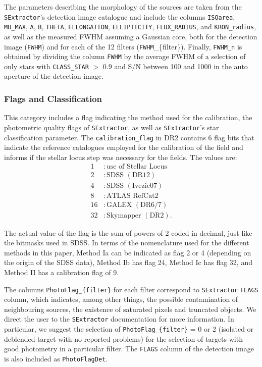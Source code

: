 \documentclass[fleqn,usenatbib]{mnras}
\begin{document}
The parameters describing the morphology of the sources are taken from the \texttt{SExtractor}'s detection image catalogue and include the columns \texttt{ISOarea}, \texttt{MU\_MAX}, \texttt{A}, \texttt{B}, \texttt{THETA}, \texttt{ELLONGATION}, \texttt{ELLIPTICITY}, \texttt{FLUX\_RADIUS}, and \texttt{KRON\_radius}, as well as the measured FWHM assuming a Gaussian core, both for the detection image (\texttt{FWHM}) and for each of the 12 filters (\texttt{FWHM}\_\{filter\}). Finally, \texttt{FWHM\_n} is obtained by dividing the column \texttt{FWHM} by the average FWHM of a selection of only stars with \texttt{CLASS\_STAR} $>$ 0.9 and S/N between 100 and 1000 in the auto aperture of the detection image.


\subsubsection{Flags and Classification}

This category includes a flag indicating the method used for the calibration, the photometric quality flags of \texttt{SExtractor}, as well as \texttt{SExtractor}'s star classification parameter. The \texttt{calibration\_flag} in DR2 contains 6 flag bits that indicate the reference catalogues employed for the calibration of the field and informs if the stellar locus step was necessary for the fields. The values are:
\begin{align} 
1&: \mathrm{use\,\,of\,\,Stellar\,\,Locus} \nonumber \\ 
2&: \mathrm{SDSS\,\,(DR12)} \nonumber \\ 
4&: \mathrm{SDSS\,\,(Ivezic07)} \nonumber \\ 
8&: \mathrm{ATLAS\,\,RefCat2} \nonumber \\ 
16&: \mathrm{GALEX\,\,(DR6/7)}  \nonumber \\ 
32&: \mathrm{Skymapper\,\,(DR2)}. \nonumber
\end{align}

The actual value of the flag is the sum of powers of 2 coded in decimal, just like the bitmasks used in SDSS. In terms of the nomenclature used for the different methods in this paper, Method Ia can be indicated as flag 2 or 4 (depending on the origin of the SDSS data), Method Ib has flag 24, Method Ic has flag 32, and Method II has a calibration flag of 9.

The columns \texttt{PhotoFlag\_\{filter\}} for each filter correspond to \texttt{SExtractor} \texttt{FLAGS} column, which indicates, among other things, the possible contamination of neighbouring sources, the existence of saturated pixels and truncated objects. We direct the user to the \texttt{SExtractor} documentation for more information. In particular, we suggest the selection of \texttt{PhotoFlag\_\{filter\}} = 0 or 2 (isolated or deblended target with no reported problems) for the selection of targets with good photometry in a particular filter. The \texttt{FLAGS} column of the detection image is also included as \texttt{PhotoFlagDet}.
\end{document}
